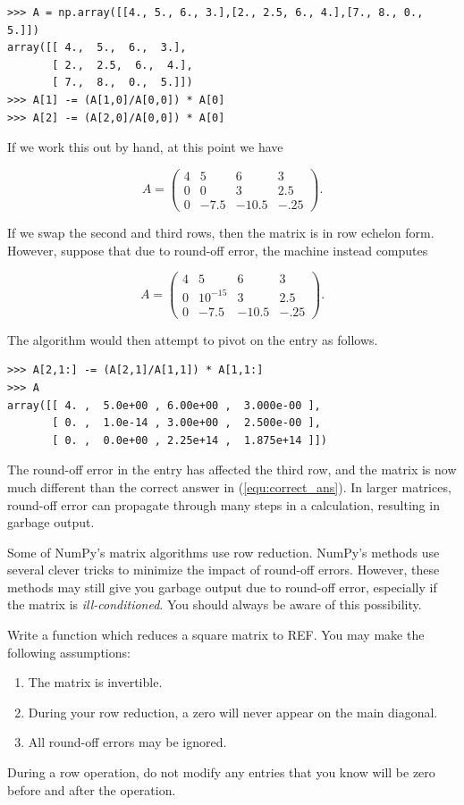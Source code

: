 \begin{lstlisting}
>>> A = np.array([[4., 5., 6., 3.],[2., 2.5, 6., 4.],[7., 8., 0., 5.]])
array([[ 4.,  5.,  6.,  3.],
       [ 2.,  2.5,  6.,  4.],
       [ 7.,  8.,  0.,  5.]])
>>> A[1] -= (A[1,0]/A[0,0]) * A[0]
>>> A[2] -= (A[2,0]/A[0,0]) * A[0]
\end{lstlisting}

If we work this out by hand, at this point we have

\begin{equation}\label{equ:correct_ans}
A = \begin{pmatrix}
4&5&6&3 \\
0&0&3&2.5 \\
0&-7.5&-10.5&-.25
\end{pmatrix}.
\end{equation}

If we swap the second and third rows, then the matrix is in row echelon form. 
However, suppose that due to round-off error, the machine instead computes

\[
A = \begin{pmatrix}
4&5&6&3 \\
0&10^{-15}&3&2.5 \\
0&-7.5&-10.5&-.25
\end{pmatrix}.
\]

The algorithm would then attempt to pivot on the  entry as follows.

\begin{lstlisting}
>>> A[2,1:] -= (A[2,1]/A[1,1]) * A[1,1:]
>>> A
array([[ 4. ,  5.0e+00 , 6.00e+00 ,  3.000e-00 ],
       [ 0. ,  1.0e-14 , 3.00e+00 ,  2.500e-00 ],
       [ 0. ,  0.0e+00 , 2.25e+14 ,  1.875e+14 ]])
\end{lstlisting}

The round-off error in the  entry has affected the third row, and the matrix is now much different than the correct answer in (\ref{equ:correct_ans}). 
In larger matrices, round-off error can propagate through many steps in a calculation, resulting in garbage output.

Some of NumPy's matrix algorithms use row reduction. 
NumPy's methods use several clever tricks to minimize the impact of round-off errors. 
However, these methods may still give you garbage output due to round-off error, especially if the matrix is \emph{ill-conditioned}. 
You should always be aware of this possibility.

\begin{problem}
\label{prob:REF}
Write a function which reduces a square matrix to REF. 
You may make the following assumptions:
\begin{enumerate}
\item The matrix is invertible.
\item During your row reduction, a zero will never appear on the main diagonal.
\item All round-off errors may be ignored.
\end{enumerate}
During a row operation, do not modify any entries that you know will be zero before and after the operation.
\end{problem}

